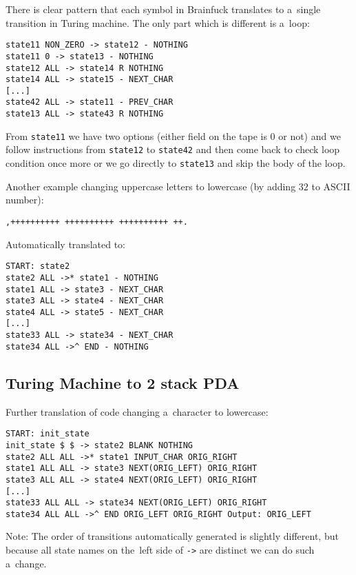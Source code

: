 \documentclass[english,shortabstract,mgr]{iithesis}
\begin{document}
There is clear pattern that each symbol in Brainfuck translates
to a~single transition in Turing machine. The only part which is different
is a~loop:
\begin{verbatim}
state11 NON_ZERO -> state12 - NOTHING
state11 0 -> state13 - NOTHING
state12 ALL -> state14 R NOTHING
state14 ALL -> state15 - NEXT_CHAR
[...]
state42 ALL -> state11 - PREV_CHAR
state13 ALL -> state43 R NOTHING
\end{verbatim}

From \texttt{state11} we have two options (either field on the tape is $0$
or not) and we follow instructions from \texttt{state12} to \texttt{state42}
and then come back to check loop condition once more or we go directly
to \texttt{state13} and skip the body of the loop.

Another example changing uppercase letters to lowercase (by adding $32$
to ASCII number):

\begin{verbatim}
,++++++++++ ++++++++++ ++++++++++ ++.
\end{verbatim}

Automatically translated to:

\begin{verbatim}
START: state2
state2 ALL ->* state1 - NOTHING
state1 ALL -> state3 - NEXT_CHAR
state3 ALL -> state4 - NEXT_CHAR
state4 ALL -> state5 - NEXT_CHAR
[...]
state33 ALL -> state34 - NEXT_CHAR
state34 ALL ->^ END - NOTHING
\end{verbatim}

\subsection{Turing Machine to 2 stack PDA}

Further translation of code changing a~character to lowercase:

\begin{verbatim}
START: init_state
init_state $ $ -> state2 BLANK NOTHING
state2 ALL ALL ->* state1 INPUT_CHAR ORIG_RIGHT
state1 ALL ALL -> state3 NEXT(ORIG_LEFT) ORIG_RIGHT
state3 ALL ALL -> state4 NEXT(ORIG_LEFT) ORIG_RIGHT
[...]
state33 ALL ALL -> state34 NEXT(ORIG_LEFT) ORIG_RIGHT
state34 ALL ALL ->^ END ORIG_LEFT ORIG_RIGHT Output: ORIG_LEFT
\end{verbatim}

Note: The order of transitions automatically generated is slightly different,
but because all state names on the~left side of \texttt{->} are distinct
we can do such a~change.
\end{document}

